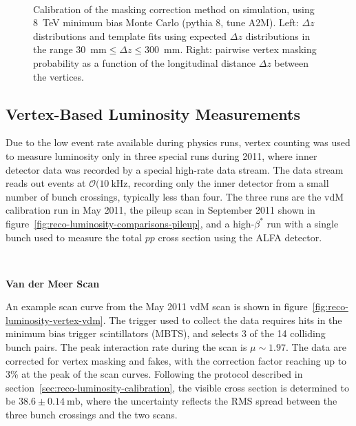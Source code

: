 \begin{figure}[p]
{	}
	\\
	\caption{Calibration of the masking correction method on simulation, using 8~TeV minimum bias Monte Carlo (pythia 8, tune A2M). Left: $\Delta z$ distributions and template fits using expected $\Delta z$ distributions in the range $30$~mm$\leq\Delta z\leq300$~mm. Right: pairwise vertex masking probability as a function of the longitudinal distance $\Delta z$ between the vertices.}
	\label{fig:masking-correction-mc}
\end{figure}

\subsection{Vertex-Based Luminosity Measurements}
Due to the low event rate available during physics runs, vertex counting was used to measure luminosity only in three special runs during 2011, where inner detector data was recorded by a special high-rate data stream. The data stream reads out events at $\mathcal{O}(10~\mbox{kHz}$, recording only the inner detector from a small number of bunch crossings, typically less than four. The three runs are the vdM calibration run in May 2011, the pileup scan in September 2011 shown in figure~\ref{fig:reco-luminosity-comparisons-pileup}, and a high-$\beta^{*}$ run with a single bunch used to measure the total $pp$ cross section using the ALFA detector. 

\ 

\textbf{Van der Meer Scan}

An example scan curve from the May 2011 vdM scan is shown in figure~\ref{fig:reco-luminosity-vertex-vdm}. The trigger used to collect the data requires hits in the minimum bias trigger scintillators (MBTS), and selects 3 of the 14 colliding bunch pairs. The peak interaction rate during the scan is $\mu\sim1.97$. The data are corrected for vertex masking and fakes, with the correction factor reaching up to 3\% at the peak of the scan curves. Following the protocol described in section~\ref{sec:reco-luminosity-calibration}, the visible cross section is determined to be $38.6\pm 0.14~\mbox{mb}$, where the uncertainty reflects the RMS spread between the three bunch crossings and the two scans.

